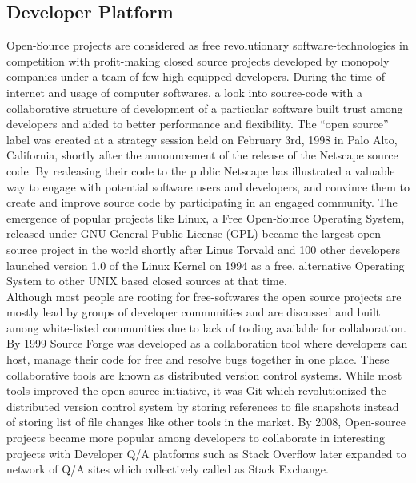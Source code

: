 \documentclass[letterpaper,11pt]{article}
\begin{document}
\subsection{\textbf{Developer Platform}}

Open-Source projects are considered as free revolutionary software-technologies in competition with profit-making closed source projects developed by monopoly companies under a team of few high-equipped developers. During the time of internet and usage of computer softwares, a look into source-code with a collaborative structure of development of a particular software built trust among developers and aided to better performance and flexibility. The “open source” label was created at a strategy session held on February 3rd, 1998 in Palo Alto, California, shortly after the announcement of the release of the Netscape source code. By realeasing their code to the public Netscape has illustrated a valuable way to engage with potential software users and developers, and convince them to create and improve source code by participating in an engaged community. The emergence of popular projects like Linux, a Free Open-Source Operating System, released under GNU General Public License (GPL) became the largest open source project in the world shortly after Linus Torvald and 100 other developers launched version 1.0 of the Linux Kernel  on 1994 as a free, alternative Operating System to other UNIX based closed sources at that time.\\

Although most people are rooting for free-softwares the open source projects are mostly lead by groups of developer communities and are discussed and built among white-listed communities due to lack of tooling available for collaboration. By 1999 Source Forge was developed as a collaboration tool where developers can host, manage their code for free and resolve bugs together in one place. These collaborative tools are known as distributed version control systems. While most tools improved the open source initiative, it was Git which revolutionized the distributed version control system by storing references to file snapshots instead of storing list of file changes like other tools in the market. By 2008, Open-source projects became more popular among developers to collaborate in interesting projects with Developer Q/A platforms such as Stack Overflow later expanded to network of Q/A sites which collectively called as Stack Exchange.\\
\end{document}
